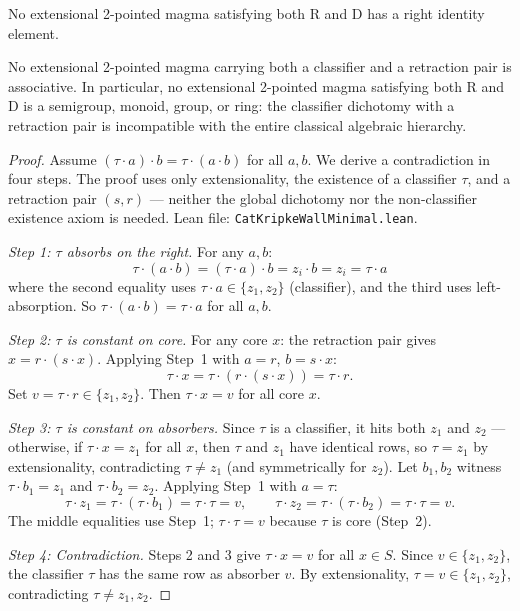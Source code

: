 \documentclass[sigconf,screen]{acmart}
\newcommand{\dotop}{\cdot}
\theoremstyle{remark}
\begin{document}
\begin{theorem}
\label{thm:no-rid}
No extensional 2-pointed magma satisfying both R and D has a right identity element.
\end{theorem}

\begin{theorem}[No Associativity]
\label{thm:no-assoc}
No extensional 2-pointed magma carrying both a classifier and a retraction pair is associative. In particular, no extensional 2-pointed magma satisfying both R and D is a semigroup, monoid, group, or ring: the classifier dichotomy with a retraction pair is incompatible with the entire classical algebraic hierarchy.
\end{theorem}

\begin{proof}
Assume $(\tau \dotop a) \dotop b = \tau \dotop (a \dotop b)$ for all $a, b$. We derive a contradiction in four steps. The proof uses only extensionality, the existence of a classifier $\tau$, and a retraction pair $(s, r)$ --- neither the global dichotomy nor the non-classifier existence axiom is needed. Lean file: \texttt{CatKripkeWallMinimal.lean}.

\emph{Step 1: $\tau$ absorbs on the right.} For any $a, b$:
\[
\tau \dotop (a \dotop b)
= (\tau \dotop a) \dotop b
= z_i \dotop b
= z_i
= \tau \dotop a
\]
where the second equality uses $\tau \dotop a \in \{z_1, z_2\}$ (classifier), and the third uses left-absorption. So $\tau \dotop (a \dotop b) = \tau \dotop a$ for all $a, b$.

\emph{Step 2: $\tau$ is constant on core.} For any core $x$: the retraction pair gives $x = r \dotop (s \dotop x)$. Applying Step~1 with $a = r$, $b = s \dotop x$:
\[
\tau \dotop x = \tau \dotop (r \dotop (s \dotop x)) = \tau \dotop r.
\]
Set $v = \tau \dotop r \in \{z_1, z_2\}$. Then $\tau \dotop x = v$ for all core $x$.

\emph{Step 3: $\tau$ is constant on absorbers.} Since $\tau$ is a classifier, it hits both $z_1$ and $z_2$ --- otherwise, if $\tau \dotop x = z_1$ for all $x$, then $\tau$ and $z_1$ have identical rows, so $\tau = z_1$ by extensionality, contradicting $\tau \neq z_1$ (and symmetrically for $z_2$). Let $b_1, b_2$ witness $\tau \dotop b_1 = z_1$ and $\tau \dotop b_2 = z_2$. Applying Step~1 with $a = \tau$:
\[
\tau \dotop z_1 = \tau \dotop (\tau \dotop b_1) = \tau \dotop \tau = v,
\qquad
\tau \dotop z_2 = \tau \dotop (\tau \dotop b_2) = \tau \dotop \tau = v.
\]
The middle equalities use Step~1; $\tau \dotop \tau = v$ because $\tau$ is core (Step~2).

\emph{Step 4: Contradiction.} Steps 2 and 3 give $\tau \dotop x = v$ for all $x \in S$. Since $v \in \{z_1, z_2\}$, the classifier $\tau$ has the same row as absorber $v$. By extensionality, $\tau = v \in \{z_1, z_2\}$, contradicting $\tau \neq z_1, z_2$.
\end{proof}
\end{document}
